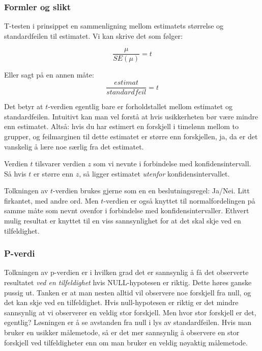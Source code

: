 \documentclass[
  letterpaper,
  DIV=11,
  numbers=noendperiod]{scrreprt}
\theoremstyle{definition}
\theoremstyle{remark}
\begin{document}
\hypertarget{formler-og-slikt}{%
\subsubsection{Formler og slikt}\label{formler-og-slikt}}

T-testen i prinsippet en sammenligning mellom estimatets størrelse og
standardfeilen til estimatet. Vi kan skrive det som følger:

\[
 \frac{\mu}{SE(\mu)} = t 
\]

Eller sagt på en annen måte: \[
 \frac{estimat}{standardfeil} = t 
\]

Det betyr at \(t\)-verdien egentlig bare er forholdstallet mellom
estimatet og standardfeilen. Intuitivt kan man vel forstå at hvis
usikkerheten bør være mindre enn estimatet. Altså: hvis du har estimert
en forskjell i timelønn mellom to grupper, og feilmarginen til dette
estimatet er større enn forskjellen, ja, da er det vanskelig å lære noe
særlig fra det estimatet.

Verdien \(t\) tilsvarer verdien \(z\) som vi nevnte i forbindelse med
konfidensintervall. Så hvis \(t\) er større enn \(z\), så ligger
estimatet \emph{utenfor} konfidensintervallet.

Tolkningen av \(t\)-verdien brukes gjerne som en en beslutningsregel:
Ja/Nei. Litt firkantet, med andre ord. Men \(t\)-verdien er også knyttet
til normalfordelingen på samme måte som nevnt ovenfor i forbindelse med
konfidensintervaller. Ethvert mulig resultat er knyttet til en viss
sannsynlighet for at det skal skje ved en tilfeldighet.

\hypertarget{p-verdi}{%
\subsubsection{P-verdi}\label{p-verdi}}

Tolkningen av p-verdien er i hvilken grad det er sannsynlig å få det
observerte resultatet \emph{ved en tilfeldighet} hvis NULL-hypotesen er
riktig. Dette høres ganske pussig ut. Tanken er at man nesten alltid vil
observere noe forskjell fra null, og det kan skje ved en tilfeldighet.
Hvis null-hypotesen er riktig er det mindre sannsynlig at vi observerer
en veldig stor forskjell. Men hvor stor forskjell er det, egentlig?
Løsningen er å se avstanden fra null i lys av standardfeilen. Hvis man
bruker en usikker målemetode, så er det mer sannsynlig å observere en
stor forskjell ved tilfeldigheter enn om man bruker en veldig nøyaktig
målemetode.
\end{document}
